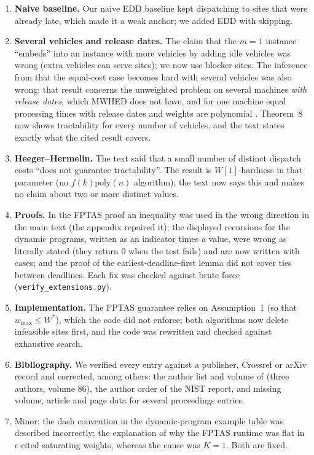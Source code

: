 \documentclass[11pt]{article}
\begin{document}
\begin{enumerate}[leftmargin=*,itemsep=3pt]
the on-time weight.
\item \textbf{Naive baseline.} Our naive EDD baseline kept dispatching to
sites that were already late, which made it a weak anchor; we added EDD
with skipping.
\item \textbf{Several vehicles and release dates.} The claim that the $m=1$
instance ``embeds'' into an instance with more vehicles by adding idle
vehicles was wrong (extra vehicles can serve sites); we now use blocker
sites. The inference from \citet{heegermolter2025} that the equal-cost case
becomes hard with several vehicles was also wrong: that result concerns
the unweighted problem on several machines \emph{with release dates},
which MWHED does not have, and for one machine equal processing times with
release dates and weights are polynomial \citep{baptiste1999}. Theorem~8
now shows tractability for every number of vehicles, and the text states
exactly what the cited result covers.
\item \textbf{Heeger--Hermelin.} The text said that a small number of
distinct dispatch costs ``does not guarantee tractability''. The result is
$W[1]$-hardness in that parameter (no $f(k)\mathrm{poly}(n)$ algorithm);
the text now says this and makes no claim about two or more distinct
values.
\item \textbf{Proofs.} In the FPTAS proof an inequality was used in the
wrong direction in the main text (the appendix repaired it); the displayed
recursions for the dynamic programs, written as an indicator times a
value, were wrong as literally stated (they return $0$ when the test
fails) and are now written with cases; and the proof of the
earliest-deadline-first lemma did not cover ties between deadlines. Each
fix was checked against brute force (\texttt{verify\_extensions.py}).
\item \textbf{Implementation.} The FPTAS guarantee relies on
Assumption~1 (so that $w_{\max}\le W^\ast$), which the code did not
enforce; both algorithms now delete infeasible sites first, and the code
was rewritten and checked against exhaustive search.
\item \textbf{Bibliography.} We verified every entry against a
publisher, Crossref or arXiv record and corrected, among others: the
author list and volume of \citet{alvelos2025} (three authors, volume 86),
the author order of the NIST report, and missing volume, article and page
data for several proceedings entries.
\item Minor: the dash convention in the dynamic-program example table was
described incorrectly; the explanation of why the FPTAS runtime was flat
in $\epsilon$ cited saturating weights, whereas the cause was $K=1$. Both
are fixed.
\end{enumerate}
\end{document}
